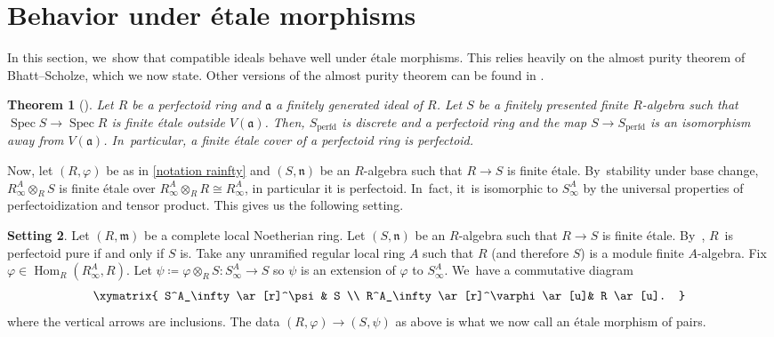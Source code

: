 \documentclass[JEP,XML,SOM,Unicode,published]{cedram}
\let\autoref\cref
\theoremstyle{plain}
\newtheorem{theorem}{Theorem}[section]
\theoremstyle{definition}
\newtheorem{setting}[theorem]{Setting}
\numberwithin{equation}{theorem}
\let\tensor\otimes
\newcommand{\fra}{\mathfrak{a}}
\newcommand{\fram}{\mathfrak{m}}
\newcommand{\fran}{\mathfrak{n}}
\DeclareMathOperator{\Hom}{Hom}
\DeclareMathOperator{\perfdd}{perfd}
\DeclareMathOperator{\Spec}{{Spec}}
\renewcommand{\phi}{\varphi}
\newcommand{\rphi}{(R,\phi)}
\newcommand{\spsi}{(S,\psi)}
\newcommand{\rafty}{R^A_\infty}
\newcommand{\safty}{S^A_\infty}
\begin{document}
\section{Behavior under étale morphisms}\label{section behavior étale morphisms}

In this section, we~show that compatible ideals behave well under étale morphisms. This relies heavily on the almost purity theorem of Bhatt--Scholze, which we now state. Other versions of the almost purity theorem can be found in \cite{FaltingsAlmostEtaleExtensions,ScholzePerfectoidSpaces,KedlayaLiuRelativeHodgeTheory,AndreLemmeAbhyankarPerfectoide}.

\begin{theorem}[{\cite[Th.\,10.9]{BhattScholzePrisms}}]
Let $R$ be a perfectoid ring and $\fra$ a finitely generated ideal of $R$. Let $S$ be a finitely presented finite $R$\nobreakdash-algebra such that $\Spec S\to \Spec R$ is finite étale outside $V(\fra)$. Then, $S_{\perfdd}$ is discrete and a perfectoid ring and the map $S\to S_{\perfdd}$ is an isomorphism away from $V(\fra)$. In~particular, a finite étale cover of a perfectoid ring is perfectoid.
\end{theorem}

Now, let $\rphi$ be as in \autoref{notation rainfty} and $(S,\fran)$ be an $R$\nobreakdash-algebra such that $R\to S$ is finite étale. By~stability under base change, $\rafty \tensor_{R} S $ is finite étale over $\rafty \tensor_{R} R \cong \rafty$, in particular it is perfectoid. In~fact, it~is isomorphic to $S^A_\infty$ by the universal properties of perfectoidization and tensor product. This gives us the following setting.

\begin{setting}\label{setting étale morphism}
Let $(R,\fram)$ be a complete local Noetherian ring. Let $(S,\fran)$ be an $R$\nobreakdash-algebra such that $R\to S$ is finite étale. By~\cite[Lem.\,4.6, Lem.\,4.15]{BMPSTWWPerfectoidPure}, $R$~is perfectoid pure if and only if $S$ is. Take any unramified regular local ring $A$ such that $R$ (and therefore $S$) is a module finite $A$-algebra.
Fix $\phi\in \Hom_R(\rafty,R)$.
Let $\psi\coloneqq \phi \tensor_{R} S\colon S^A_\infty\to S$ so $\psi$ is an extension of $\phi$ to $\safty$. We~have a commutative diagram
\begin{equation}\label{comm diag extension of pairs}
\begin{array}{c}
\xymatrix{
\safty \ar[r]^\psi & S \\
\rafty\ar[r]^\phi \ar[u]& R \ar[u].
}
\end{array}
\end{equation}
where the vertical arrows are inclusions. The data $\rphi\to \spsi$ as above is what we now call an étale morphism of pairs.
\end{setting}
\end{document}
